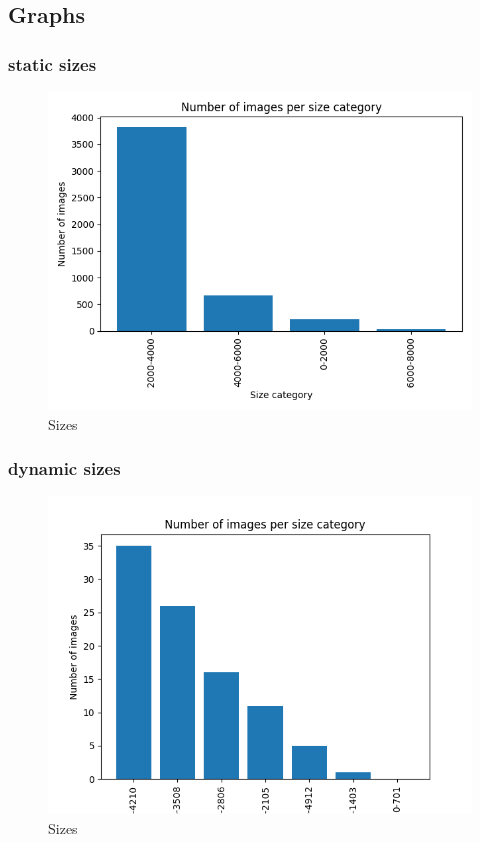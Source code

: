 \documentclass{article}
\begin{document}
    \newpage

    \subsection{Graphs}\label{subsec:graphs}

    \subsubsection{static sizes}\label{subsubsec:static_sizes}

    \begin{figure}[htbp]
        \centering
        \includegraphics[width=0.7 \textwidth]{img/size_static}
        \caption{Sizes}
        \label{fig:static_sizes}
    \end{figure}

    \subsubsection{dynamic sizes}\label{subsubsec:dynamic_sizes}

    \begin{figure}[htbp]
        \centering
        \includegraphics[width=0.65 \textwidth]{img/size_dynamic}
        \caption{Sizes}
        \label{fig:dynamic_sizes}
    \end{figure}
\end{document}
